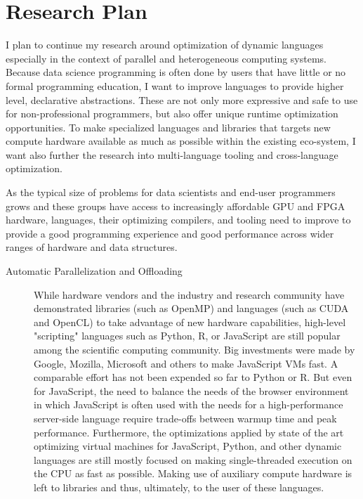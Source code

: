 \documentclass[11pt,a4paper,sans]{moderncv} %
\begin{document}

\clearpage

\section{Research Plan}
\label{sec:research}
\begin{refsection}[plan]
  I plan to continue my research around optimization of dynamic languages
  especially in the context of parallel and heterogeneous computing
  systems. Because data science programming is often done by users that have
  little or no formal programming education, I want to improve languages to
  provide higher level, declarative abstractions. These are not only more
  expressive and safe to use for non-professional programmers, but also offer
  unique runtime optimization opportunities. To make specialized languages and
  libraries that targets new compute hardware available as much as possible
  within the existing eco-system, I want also further the research into
  multi-language tooling and cross-language optimization.

  As the typical size of problems for data scientists and end-user programmers
  grows and these groups have access to increasingly affordable GPU and FPGA
  hardware, languages, their optimizing compilers, and tooling need to improve
  to provide a good programming experience and good performance across wider
  ranges of hardware and data structures.

  \begin{description}
  \item[Automatic Parallelization and Offloading] While hardware vendors and the
    industry and research community have demonstrated libraries (such as OpenMP)
    and languages (such as CUDA and OpenCL) to take advantage of new hardware
    capabilities, high-level "scripting" languages such as Python, R, or
    JavaScript are still popular among the scientific computing community. Big
    investments were made by Google, Mozilla, Microsoft and others to make
    JavaScript VMs fast. A comparable effort has not been expended so far to
    Python or R. But even for JavaScript, the need to balance the needs of the
    browser environment in which JavaScript is often used with the needs for a
    high-performance server-side language require trade-offs between warmup time
    and peak performance. Furthermore, the optimizations applied by state of the
    art optimizing virtual machines for JavaScript, Python, and other dynamic
    languages are still mostly focused on making single-threaded execution on
    the CPU as fast as possible. Making use of auxiliary compute hardware is
    left to libraries and thus, ultimately, to the user of these languages.


\end{description}
\end{refsection}
\end{document}
